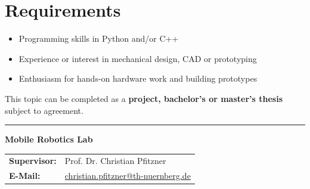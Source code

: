 \documentclass{ohm_project_description}
\begin{document}
\section*{Requirements}
\begin{itemize}[leftmargin=0.5cm]
    \setlength\itemsep{.1em}
    \item Programming skills in Python and/or C++
    \item Experience or interest in mechanical design, CAD or prototyping
    \item Enthusiasm for hands-on hardware work and building prototypes
\end{itemize}

\vspace{0.5cm}
This topic can be completed as a \textbf{project, bachelor's or master's thesis} subject to agreement.

\vfill
\textcolor{ohm_red}{\rule{\linewidth}{0.4mm}}
\textbf{\textcolor{ohm_red}{Mobile Robotics Lab}} \\
\begin{tabular}{@{}ll}
\textbf{Supervisor:} & Prof. Dr. Christian Pfitzner \\
\textbf{E-Mail:}     & \href{mailto:christian.pfitzner@th-nuernberg.de}{christian.pfitzner@th-nuernberg.de} \\
\end{tabular}
\end{document}

